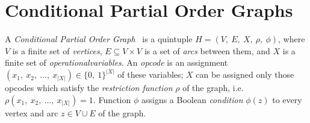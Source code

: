 \section{Conditional Partial Order Graphs\label{sec:CPOG-model-essentials}}

A \emph{Conditional Partial Order Graph}~\cite{2009_mokhov_phd}\cite{2010_mokhov_ieee}
is a quintuple $H=(V,\ E,\ X,\ \rho,\ \phi)$, where $V$ is a finite
set of \emph{vertices}, $E\subseteq V\times V$ is a set of \emph{arcs}
between them, and $X$ is a finite set of \emph{operational}\emph{variables}. An \emph{opcode} is an assignment $(x_{1},\ x_{2},\ \dots,\ x_{|X|})\in\{0,\ 1\}^{|X|}$
of these variables; $X$ can be assigned only those opcodes which
satisfy the \emph{restriction function} $\rho$
of the graph, i.e. $\rho(x_{1},\ x_{2},\ \dots,\ x_{|X|})=1$. Function
$\phi$ assigns a Boolean \emph{condition} $\phi(z)$ to every vertex
and arc $z\in V\cup E$ of the graph.

